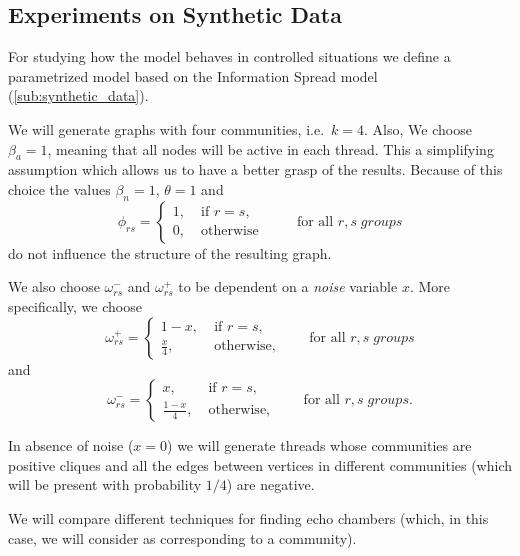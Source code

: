 \subsection{Experiments on Synthetic Data}%
\label{sub:testing_on_synthetic_data}

For studying how the model behaves in controlled situations we define a
parametrized model based on the Information Spread model
(\autoref{sub:synthetic_data}).

We will generate graphs with four communities, i.e.\ $k= 4$. Also, We choose $\beta _{a} = 1$, meaning that all nodes will be active in each
thread. This a
simplifying assumption which allows us to have a better grasp of the results.
Because of this choice the values $\beta _n = 1$, $\theta = 1$ and
\begin{equation}
	\phi_{rs}  =
	\begin{cases}
		1, \; & \text{if } r = s, \\
		0, \; & \text{otherwise }
	\end{cases} \quad\quad \text{for all } r,s \; groups
\end{equation}
do not influence the structure of the resulting graph.

We also choose $\omega ^{-} _{rs}$ and $\omega ^{+} _{rs} $ to be dependent on
a \emph{noise} variable $x$. More specifically, we choose
\begin{equation}
	\omega_{rs}^{+}   =
	\begin{cases}
		1 - x, \;        & \text{if } r = s, \\
		\frac{x}{4},  \; & \text{otherwise,}
	\end{cases} \quad\quad \text{for all } r,s \; groups
\end{equation}
and
\begin{equation}
	\omega_{rs}^{-}   =
	\begin{cases}
		x, \;                & \text{if } r = s, \\
		\frac{1 - x}{4},  \; & \text{otherwise,}
	\end{cases} \quad\quad \text{for all } r,s \; groups.
\end{equation}

In absence of noise ($x = 0$) we will generate threads whose communities are
positive cliques and all the edges between vertices in different communities
(which will be present with probability $1/4$) are negative.

We will compare different techniques for finding echo chambers (which,
in this case, we will consider as corresponding to a community).

